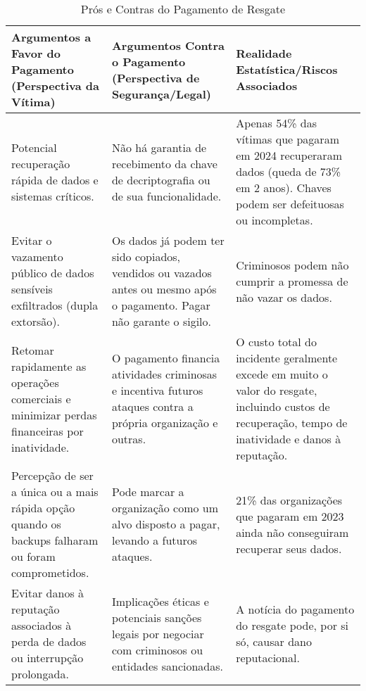 \begin{table}[ht]
\centering
\small
\caption{Prós e Contras do Pagamento de Resgate}
\label{tab:tabela_pagamento_resgate.tex}
\begin{tabular}{|p{4cm}|p{5cm}|p{5.5cm}|}
\hline
\textbf{Argumentos a Favor do Pagamento (Perspectiva da Vítima)} & \textbf{Argumentos Contra o Pagamento (Perspectiva de Segurança/Legal)} & \textbf{Realidade Estatística/Riscos Associados} \\
\hline
Potencial recuperação rápida de dados e sistemas críticos. & Não há garantia de recebimento da chave de decriptografia ou de sua funcionalidade. & Apenas 54\% das vítimas que pagaram em 2024 recuperaram dados (queda de 73\% em 2 anos). Chaves podem ser defeituosas ou incompletas. \\
\hline
Evitar o vazamento público de dados sensíveis exfiltrados (dupla extorsão). & Os dados já podem ter sido copiados, vendidos ou vazados antes ou mesmo após o pagamento. Pagar não garante o sigilo. & Criminosos podem não cumprir a promessa de não vazar os dados. \\
\hline
Retomar rapidamente as operações comerciais e minimizar perdas financeiras por inatividade. & O pagamento financia atividades criminosas e incentiva futuros ataques contra a própria organização e outras. & O custo total do incidente geralmente excede em muito o valor do resgate, incluindo custos de recuperação, tempo de inatividade e danos à reputação. \\
\hline
Percepção de ser a única ou a mais rápida opção quando os backups falharam ou foram comprometidos. & Pode marcar a organização como um alvo disposto a pagar, levando a futuros ataques. & 21\% das organizações que pagaram em 2023 ainda não conseguiram recuperar seus dados. \\
\hline
Evitar danos à reputação associados à perda de dados ou interrupção prolongada. & Implicações éticas e potenciais sanções legais por negociar com criminosos ou entidades sancionadas. & A notícia do pagamento do resgate pode, por si só, causar dano reputacional. \\
\hline
\end{tabular}
\end{table}
